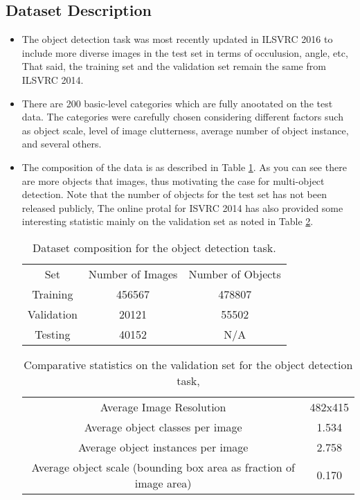 \documentclass{article}
\begin{document}
\subsection{Dataset Description}
\begin{itemize}
    \item The object detection task was most recently updated in ILSVRC 2016 to include more diverse images in the test set in terms of occulusion, angle, etc, That said, the training set and the validation set remain the same from ILSVRC 2014.
    \item There are 200 basic-level categories which are fully anootated on the test data. The categories were carefully chosen considering different factors such as object scale, level of image clutterness, average number of object instance, and several others.
    \item The composition of the data is as described in Table \ref{object-detection-dataset}. As you can see there are more objects that images, thus motivating the case for multi-object detection. Note that the number of objects for the test set has not been released publicly, The online protal for ISVRC 2014 has also provided some interesting statistic mainly on the validation set as noted in Table \ref{object-detection-validation}.
    \begin{table}[t]
    \centering
    \begin{tabular}{c|cc}
        Set & Number of Images & Number of Objects \\
        Training & 456567 & 478807 \\
        Validation & 20121 & 55502 \\
        Testing & 40152 & N/A
    \end{tabular}
    \caption{Dataset composition for the object detection task.}
    \label{object-detection-dataset}
    \end{table}
    \begin{table}[t]
        \centering
        \begin{tabular}{c|c}
            Average Image Resolution & 482x415  \\
            Average object classes per image & 1.534 \\
            Average object instances per image & 2.758 \\
            Average object scale (bounding box area as fraction of image area) & 0.170 \\
        \end{tabular}
        \caption{Comparative statistics on the validation set for the object detection task,}
        \label{object-detection-validation}
    \end{table}
\end{itemize}
\end{document}
